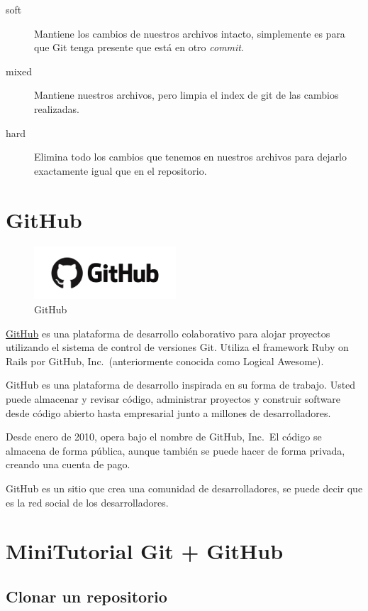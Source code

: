 \begin{description}
\item [soft] Mantiene los cambios de nuestros archivos intacto,
  simplemente es para que Git tenga presente que está en otro
  \emph{commit}.
\item [mixed] Mantiene nuestros archivos, pero limpia el index de
  git de las cambios realizadas.
\item [hard] Elimina todo los cambios que tenemos en nuestros
  archivos para dejarlo exactamente igual que en el repositorio.
\end{description}

\section{GitHub}

\begin{figure}
\centering
\includegraphics[width=2.08333in,height=\textheight]{img/github.png}
\caption{GitHub}
\end{figure}

\href{https://github.com/}{GitHub} es una plataforma de desarrollo
colaborativo para alojar proyectos utilizando el sistema de control de
versiones Git. Utiliza el framework Ruby on Rails por GitHub,
Inc.~(anteriormente conocida como Logical Awesome).

GitHub es una plataforma de desarrollo inspirada en su forma de trabajo.
Usted puede almacenar y revisar código, administrar proyectos y
construir software desde código abierto hasta empresarial junto a
millones de desarrolladores.

Desde enero de 2010, opera bajo el nombre de GitHub, Inc.~El código se
almacena de forma pública, aunque también se puede hacer de forma
privada, creando una cuenta de pago.

GitHub es un sitio que crea una comunidad de desarrolladores, se puede
decir que es la red social de los desarrolladores.

\section{MiniTutorial Git + GitHub}

\subsection{Clonar un repositorio}

